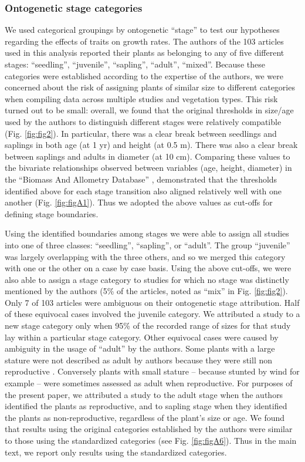 \documentclass[a4paper,11pt]{article}
\begin{document}
\subsubsection*{Ontogenetic stage categories}

We used categorical groupings by ontogenetic ``stage'' to test our hypotheses regarding the effects of traits on growth rates. The authors of the 103 articles used in this analysis reported their plants as belonging to any of five different stages: ``seedling'', ``juvenile'', ``sapling'', ``adult'', ``mixed''. Because these categories were established according to the expertise of the authors, we were concerned about the risk of assigning plants of similar size to different categories when compiling data across multiple studies and vegetation types. This risk turned out to be small: overall, we found that the original thresholds in size/age used by the authors to distinguish different stages were relatively compatible (Fig. \ref{fig:fig2}). In particular, there was a clear break between seedlings and saplings in both age (at 1 yr) and height (at 0.5 m). There was also a clear break between saplings and adults in diameter (at 10 cm). Comparing these values to the bivariate relationships observed between variables (age, height, diameter) in the ``Biomass And Allometry Database'' \citep{Falster:2015}, demonstrated that the thresholds identified above for each stage transition also aligned relatively well with one another (Fig. \ref{fig:figA1}). Thus we adopted the above values as cut-offs for defining stage boundaries.

Using the identified boundaries among stages we were able to assign all studies into one of three classes: ``seedling'', ``sapling'', or ``adult''. The group ``juvenile'' was largely overlapping with the three others, and so we merged this category with one or the other on a case by case basis. Using the above cut-offs, we were also able to assign a stage category to studies for which no stage was distinctly mentioned by the authors (5\% of the articles, noted as ``mix'' in Fig. \ref{fig:fig2}). Only 7 of 103 articles were ambiguous on their ontogenetic stage attribution. Half of these equivocal cases involved the juvenile category. We attributed a study to a new stage category only when 95\% of the recorded range of sizes for that study lay within a particular stage category. Other equivocal cases were caused by ambiguity in the usage of ``adult'' by the authors. Some plants with a large stature were not described as adult by authors because they were still non reproductive \citep{King:2006he}. Conversely plants with small stature -- because stunted by wind for example \citep{Stratton:2001ck} -- were sometimes assessed as adult when reproductive. For purposes of the present paper, we attributed a study to the adult stage when the authors identified the plants as reproductive, and to sapling stage when they identified the plants as non-reproductive, regardless of the plant's size or age. We found that results using the original categories established by the authors were similar to those using the standardized categories (see Fig. \ref{fig:figA6}).  Thus in the main text, we report only results using the standardized categories.
\end{document}
